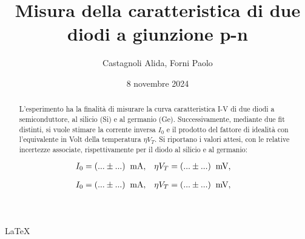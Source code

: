 \documentclass[11pt]{article}
\begin{document}
\LaTeX

\title{\textbf{Misura della caratteristica di due diodi a giunzione p-n}}
\author{Castagnoli Alida, Forni Paolo}
\date{8 novembre 2024}
\maketitle

\begin{abstract}
    L'esperimento ha la finalità di misurare la curva caratteristica \mbox{I-V} di due diodi a semiconduttore, al silicio (Si) e al germanio (Ge). 
    Successivamente, mediante due fit distinti, si vuole stimare la corrente inversa $I_{0}$ e il prodotto del fattore di idealità con l'equivalente in Volt della temperatura $\eta V_{T}$.  
    Si riportano i valori attesi, con le relative incertezze associate, rispettivamente per il diodo al silicio e al germanio:

    \begin{align*}
        I_{0} &= (... \pm ...) \;\;\textnormal{mA}, & 
        \eta V_{T} &= (... \pm ...)\;\;\textnormal{mV}, &
    \end{align*}

    \vspace{-0.6cm}

    \begin{align*}
        I_{0} &= (... \pm ...) \;\;\textnormal{mA}, & 
        \eta V_{T} &= (... \pm ...)\;\;\textnormal{mV}, &
    \end{align*}

\end{abstract}



\end{document}
